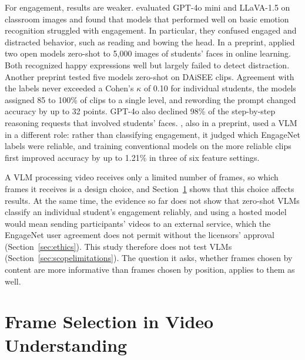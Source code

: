 For engagement, results are weaker.  evaluated GPT-4o mini and LLaVA-1.5 on classroom images and found that models that performed well on basic emotion recognition struggled with engagement. In particular, they confused engaged and distracted behavior, such as reading and bowing the head. In a preprint,  applied two open models zero-shot to 5,000 images of students' faces in online learning. Both recognized happy expressions well but largely failed to detect distraction. Another preprint \cite{goyal2026} tested five models zero-shot on DAiSEE clips. Agreement with the labels never exceeded a Cohen's $\kappa$ of 0.10 for individual students, the models assigned 85 to 100\% of clips to a single level, and rewording the prompt changed accuracy by up to 32 points. GPT-4o also declined 98\% of the step-by-step reasoning requests that involved students' faces. , also in a preprint, used a VLM in a different role: rather than classifying engagement, it judged which EngageNet labels were reliable, and training conventional models on the more reliable clips first improved accuracy by up to 1.21\% in three of six feature settings.

A VLM processing video receives only a limited number of frames, so which frames it receives is a design choice, and Section~\ref{sec:rw-sampling} shows that this choice affects results. At the same time, the evidence so far does not show that zero-shot VLMs classify an individual student's engagement reliably, and using a hosted model would mean sending participants' videos to an external service, which the EngageNet user agreement does not permit without the licensors' approval (Section~\ref{sec:ethics}). This study therefore does not test VLMs (Section~\ref{sec:scopelimitations}). The question it asks, whether frames chosen by content are more informative than frames chosen by position, applies to them as well.



\section{Frame Selection in Video Understanding}
\label{sec:rw-sampling}

